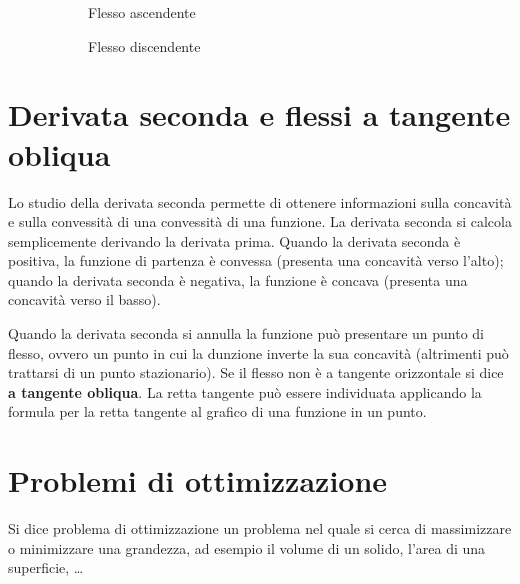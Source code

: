 \begin{figure}[ht]
\begin{subfigure}{0.24\textwidth}
        \caption{Flesso ascendente}
    \end{subfigure}
    \begin{subfigure}{0.24\textwidth}
        \centering
        \caption{Flesso discendente}
    \end{subfigure}
    \caption{}
\end{figure}
\section{Derivata seconda e flessi a tangente obliqua}
Lo studio della derivata seconda permette di ottenere informazioni sulla concavità e sulla convessità di una convessità di una funzione. La derivata seconda si calcola semplicemente derivando la derivata prima. Quando la derivata seconda è positiva, la funzione di partenza è convessa (presenta una concavità verso l'alto); quando la derivata seconda è negativa, la funzione è concava (presenta una concavità verso il basso).

Quando la derivata seconda si annulla la funzione può presentare un punto di flesso, ovvero un punto in cui la dunzione inverte la sua concavità (altrimenti può trattarsi di un punto stazionario). Se il flesso non è a tangente orizzontale si dice \textbf{a tangente obliqua}. La retta tangente può essere individuata applicando la formula per la retta tangente al grafico di una funzione in un punto.
\section{Problemi di ottimizzazione}
Si dice problema di ottimizzazione un problema nel quale si cerca di massimizzare o minimizzare una grandezza, ad esempio il volume di un solido, l'area di una superficie, \dots

